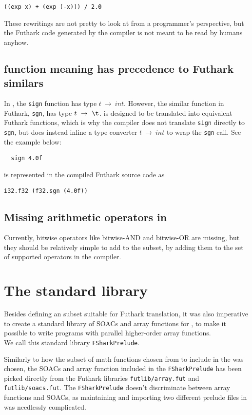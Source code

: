 \begin{lstlisting}[language=Futhark]
  ((exp x) + (exp (-x))) / 2.0
\end{lstlisting}

These rewritings are not pretty to look at from a programmer's perspective, but
the Futhark code generated by the \fshark{} compiler is not meant to be read by humans anyhow.

\subsection{\fshark{} function meaning has precedence to Futhark similars}
\label{functionmeaning}
In \fshark{}, the \texttt{sign} function has type $t~\to~int$. However, the similar
function in Futhark, \texttt{sgn}, has type $t~\to~\t$.
\fshark{} is designed to be translated into equivalent Futhark functions, which
is why the \fshark{} compiler does not translate \texttt{sign} directly to
\texttt{sgn}, but does instead inline a type converter $t~\to~int$ to wrap the
\texttt{sgn} call. See the example below:
\begin{verbatim}
  sign 4.0f
\end{verbatim}
is represented in the \fshark{} compiled Futhark source code as
\begin{lstlisting}[language=Futhark]
  i32.f32 (f32.sgn (4.0f))
\end{lstlisting}

\subsection{Missing arithmetic operators in \fshark{}}
Currently, bitwise operators like bitwise-AND and bitwise-OR are missing, but
they should be relatively simple to add to the \fshark{} subset, by adding them
to the set of supported operators in the \fshark{} compiler.

\section{The \fshark{} standard library}
Besides defining an \fsharp{} subset suitable for Futhark translation, it was
also imperative to create a standard library of SOACs and array functions for \fshark{},
to make it possible to write programs with parallel higher-order array
functions.
\\
We call this standard library \texttt{FSharkPrelude}.

Similarly to how the subset of math functions chosen from \fsharp{} to include in
the \fshark{} was chosen, the SOACs and array function included in the
\texttt{FSharkPrelude} has been picked directly from the Futhark libraries
\texttt{futlib/array.fut} and \texttt{futlib/soacs.fut}. The \texttt{FSharkPrelude} doesn't
discriminate between array functions and SOACs, as maintaining and importing two
different prelude files in \fshark{} was needlessly complicated.

